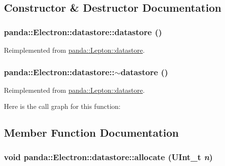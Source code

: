 \subsection{Constructor \& Destructor Documentation}
\hypertarget{structpanda_1_1Electron_1_1datastore_a2be5528c91b18d47c8c277a4f21ca899}{
\subsubsection[{datastore}]{\setlength{\rightskip}{0pt plus 5cm}panda::Electron::datastore::datastore ()}}
\label{structpanda_1_1Electron_1_1datastore_a2be5528c91b18d47c8c277a4f21ca899}


Reimplemented from \hyperlink{structpanda_1_1Lepton_1_1datastore_adf84bb1f833eb50c3c73d81af211496e}{panda::Lepton::datastore}.\hypertarget{structpanda_1_1Electron_1_1datastore_af9dfc2f8a0fca924c40cc0d488f6bb02}{
\subsubsection[{$\sim$datastore}]{\setlength{\rightskip}{0pt plus 5cm}panda::Electron::datastore::$\sim$datastore ()}}
\label{structpanda_1_1Electron_1_1datastore_af9dfc2f8a0fca924c40cc0d488f6bb02}


Reimplemented from \hyperlink{structpanda_1_1Lepton_1_1datastore_aded63fdccd7551ae16f99adbd29afb82}{panda::Lepton::datastore}.

Here is the call graph for this function:

\subsection{Member Function Documentation}
\hypertarget{structpanda_1_1Electron_1_1datastore_a3e84b684132c59a589f7a041cae61507}{
\subsubsection[{allocate}]{\setlength{\rightskip}{0pt plus 5cm}void panda::Electron::datastore::allocate (UInt\_\-t {\em n})}}
\label{structpanda_1_1Electron_1_1datastore_a3e84b684132c59a589f7a041cae61507}


